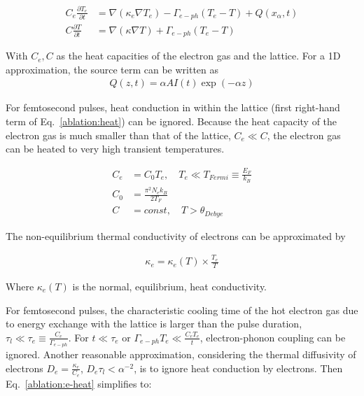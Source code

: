         \begin{align}
            C_e \frac{\partial T_e}{\partial t} &= \nabla (\kappa_e \nabla T_e) - \Gamma_{e-ph}(T_e - T) + Q(x_\alpha, t) \label{ablation:e-heat} \\
            C \frac{\partial T}{\partial t} &= \nabla (\kappa \nabla T) + \Gamma_{e-ph}(T_e - T) \label{ablation:heat}
        \end{align}

        With $C_e, C$ as the heat capacities of the electron gas and the lattice. For a 1D approximation, the source term can
        be written as
        \begin{align}
            Q(z,t) = \alpha A I(t) \exp(-\alpha z)
        \end{align}

        For femtosecond pulses, heat conduction in within the lattice (first right-hand term of Eq.~\ref{ablation:heat}) can be ignored.
        Because the heat capacity of the electron gas is much smaller than that of the lattice, $C_e \ll C$,  the electron gas can
        be heated to very high transient temperatures.

        \begin{align}
            C_e &= C_0 T_e, \quad T_e \ll T_{Fermi} \equiv \frac{E_F}{k_B} \\
            C_0 &= \frac{\pi^2 N_e k_B}{2T_F} \\
            C &= const, \quad T > \theta_{Debye}
        \end{align}

        The non-equilibrium thermal conductivity of electrons can be approximated by

        \begin{align}
            \kappa_e = \kappa_e(T) \times \frac{T_e}{T}
        \end{align}

        Where $\kappa_e(T)$ is the normal, equilibrium, heat conductivity.

            For femtosecond pulses, the characteristic cooling time of the hot electron gas due to energy exchange with the lattice
        is larger than the pulse duration, $\tau_l \ll \tau_e \equiv \frac{C_e}{\Gamma_{e-ph}}$. For
        $t \ll \tau_e$ or $\Gamma_{e-ph}T_e \ll \frac{C_e T_e}{t}$, electron-phonon coupling can be ignored. Another reasonable approximation,
        considering the thermal diffusivity of electrons $D_e = \frac{\kappa_e}{C_e}$, $D_e\tau_l < \alpha^{-2}$, is to ignore heat
        conduction by electrons. Then Eq.~\ref{ablation:e-heat} simplifies to:

